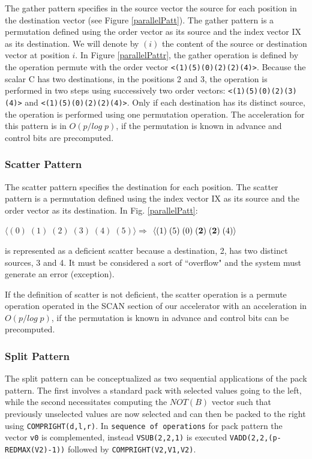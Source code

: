 The gather pattern specifies in the source vector the source for each position in the destination vector (see Figure \ref{parallelPatt}). The gather pattern is a permutation defined using the order vector as its source and the index vector IX as its destination. We will denote by $(i)$ the content of the source or destination vector at position $i$.
In Figure \ref{parallelPattr}, the gather operation is defined by the operation permute with the order vector {\tt <(1)(5)(0)(2)(2)(4)>}.
Because the scalar C has two destinations, in the positions 2 and 3, the operation is performed in two steps using successively two order vectors: {\tt <(1)(5)(0)(2)(3)(4)>} and {\tt <(1)(5)(0)(2)(2)(4)>}.
Only if each destination has its distinct source, the operation is performed using one permutation operation. The acceleration for this pattern is in $O(p / log \; p)$, if the permutation is known in advance and control bits are precomputed.

\subsubsection{Scatter  Pattern}

The scatter pattern specifies the destination for each position. The scatter pattern is a permutation defined using the index vector IX as its source and the order vector as its destination. In Fig. \ref{parallelPatt}:
\begin{center}
$ \langle  (0) \; (1) \; (2) \; (3) \; (4) \; (5) \rangle  \Rightarrow $
$\langle (1) \;  (5) \; (0) \; ({\bf 2}) \; ({\bf 2}) \; (4) \rangle  $
\end{center}
is represented as a deficient scatter because a destination, 2, has two distinct sources, 3 and 4. It must be considered a sort of ``overflow" and the system must generate an error (exception).

If the definition of scatter is not deficient, the scatter operation is a permute operation operated in the SCAN section of our accelerator with an acceleration in $O(p/log \; p)$, if the permutation is known in advance and control bits can be precomputed. 

\subsubsection{Split  Pattern}

The split pattern can be conceptualized as two sequential applications of the pack pattern. The first involves a standard pack with selected values going to the left, while the second necessitates computing the $NOT (B)$ vector such that previously unselected values are now selected and can then be packed to the right using {\tt COMPRIGHT(d,l,r)}. In {\tt sequence of operations} for pack pattern the vector {\tt v0} is complemented, instead {\tt VSUB(2,2,1)} is executed {\tt VADD(2,2,(p-REDMAX(V2)-1))} followed by {\tt COMPRIGHT(V2,V1,V2)}.

